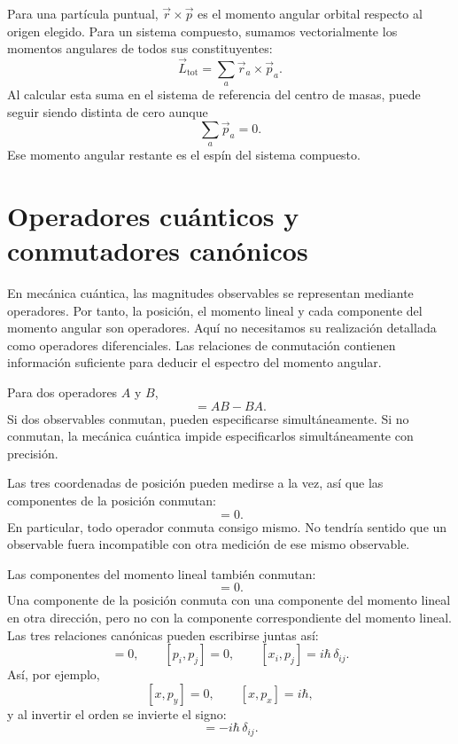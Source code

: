 Para una partícula puntual, \(\vec r\times\vec p\) es el momento angular orbital respecto al origen elegido. Para un sistema compuesto, sumamos vectorialmente los momentos angulares de todos sus constituyentes:
\begin{equation}
\vec L_{\mathrm{tot}}=\sum_a \vec r_a\times\vec p_a.
\end{equation}
Al calcular esta suma en el sistema de referencia del centro de masas, puede seguir siendo distinta de cero aunque
\[
\sum_a\vec p_a=0.
\]
Ese momento angular restante es el espín del sistema compuesto.

\section{Operadores cuánticos y conmutadores canónicos}

En mecánica cuántica, las magnitudes observables se representan mediante operadores. Por tanto, la posición, el momento lineal y cada componente del momento angular son operadores. Aquí no necesitamos su realización detallada como operadores diferenciales. Las relaciones de conmutación contienen información suficiente para deducir el espectro del momento angular.

Para dos operadores \(A\) y \(B\),
\begin{equation}
[A,B]=AB-BA.
\end{equation}
Si dos observables conmutan, pueden especificarse simultáneamente. Si no conmutan, la mecánica cuántica impide especificarlos simultáneamente con precisión.

Las tres coordenadas de posición pueden medirse a la vez, así que las componentes de la posición conmutan:
\begin{equation}
[x_i,x_j]=0.
\end{equation}
En particular, todo operador conmuta consigo mismo. No tendría sentido que un observable fuera incompatible con otra medición de ese mismo observable.

Las componentes del momento lineal también conmutan:
\begin{equation}
[p_i,p_j]=0.
\end{equation}
Una componente de la posición conmuta con una componente del momento lineal en otra dirección, pero no con la componente correspondiente del momento lineal. Las tres relaciones canónicas pueden escribirse juntas así:
\begin{equation}
[x_i,x_j]=0,\qquad
[p_i,p_j]=0,\qquad
[x_i,p_j]=i\hbar\,\delta_{ij}.
\end{equation}
Así, por ejemplo,
\[
[x,p_y]=0,\qquad [x,p_x]=i\hbar,
\]
y al invertir el orden se invierte el signo:
\begin{equation}
[p_j,x_i]=-i\hbar\,\delta_{ij}.
\end{equation}

